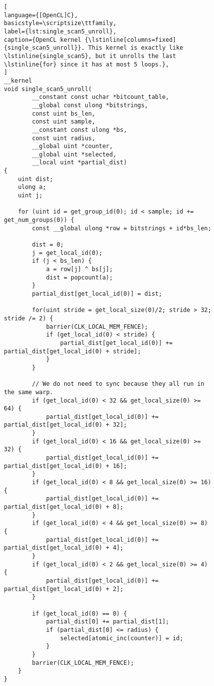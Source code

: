 \begin{figure}[!p]
\begin{lstlisting}[
language={[OpenCL]C},
basicstyle=\scriptsize\ttfamily,
label={lst:single_scan5_unroll},
caption={OpenCL kernel {\lstinline[columns=fixed]{single_scan5_unroll}}. This kernel is exactly like \lstinline{single_scan5}, but it unrolls the last \lstinline{for} since it has at most 5 loops.},
]
__kernel
void single_scan5_unroll(
        __constant const uchar *bitcount_table,
        __global const ulong *bitstrings,
        const uint bs_len,
        const uint sample,
        __constant const ulong *bs,
        const uint radius,
        __global uint *counter,
        __global uint *selected,
        __local uint *partial_dist)
{
    uint dist;
    ulong a;
    uint j;

    for (uint id = get_group_id(0); id < sample; id += get_num_groups(0)) {
        const __global ulong *row = bitstrings + id*bs_len;

        dist = 0;
        j = get_local_id(0);
        if (j < bs_len) {
            a = row[j] ^ bs[j];
            dist = popcount(a);
        }
        partial_dist[get_local_id(0)] = dist;

        for(uint stride = get_local_size(0)/2; stride > 32; stride /= 2) {
            barrier(CLK_LOCAL_MEM_FENCE);
            if (get_local_id(0) < stride) {
                partial_dist[get_local_id(0)] += partial_dist[get_local_id(0) + stride];
            }
        }

        // We do not need to sync because they all run in the same warp.
        if (get_local_id(0) < 32 && get_local_size(0) >= 64) {
            partial_dist[get_local_id(0)] += partial_dist[get_local_id(0) + 32];
        }
        if (get_local_id(0) < 16 && get_local_size(0) >= 32) {
            partial_dist[get_local_id(0)] += partial_dist[get_local_id(0) + 16];
        }
        if (get_local_id(0) < 8 && get_local_size(0) >= 16) {
            partial_dist[get_local_id(0)] += partial_dist[get_local_id(0) + 8];
        }
        if (get_local_id(0) < 4 && get_local_size(0) >= 8) {
            partial_dist[get_local_id(0)] += partial_dist[get_local_id(0) + 4];
        }
        if (get_local_id(0) < 2 && get_local_size(0) >= 4) {
            partial_dist[get_local_id(0)] += partial_dist[get_local_id(0) + 2];
        }

        if (get_local_id(0) == 0) {
            partial_dist[0] += partial_dist[1];
            if (partial_dist[0] <= radius) {
                selected[atomic_inc(counter)] = id;
            }
        }
        barrier(CLK_LOCAL_MEM_FENCE);
    }
}
\end{lstlisting}
\end{figure}

